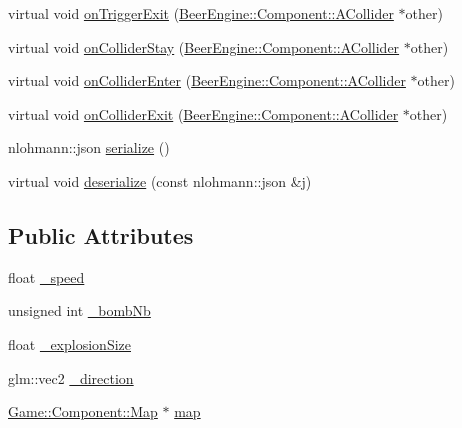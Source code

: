 \begin{DoxyCompactItemize}
\item 
virtual void \mbox{\hyperlink{class_game_1_1_component_1_1_character_a1acc86ac5340ef65ba18d755f1ea37f9}{on\+Trigger\+Exit}} (\mbox{\hyperlink{class_beer_engine_1_1_component_1_1_a_collider}{Beer\+Engine\+::\+Component\+::\+A\+Collider}} $\ast$other)
\item 
virtual void \mbox{\hyperlink{class_game_1_1_component_1_1_character_afdb1ebc07baa1a95840af9dfb48d9348}{on\+Collider\+Stay}} (\mbox{\hyperlink{class_beer_engine_1_1_component_1_1_a_collider}{Beer\+Engine\+::\+Component\+::\+A\+Collider}} $\ast$other)
\item 
virtual void \mbox{\hyperlink{class_game_1_1_component_1_1_character_abf25f82178afa36cf7fcf148877fad24}{on\+Collider\+Enter}} (\mbox{\hyperlink{class_beer_engine_1_1_component_1_1_a_collider}{Beer\+Engine\+::\+Component\+::\+A\+Collider}} $\ast$other)
\item 
virtual void \mbox{\hyperlink{class_game_1_1_component_1_1_character_afe4232175cd33c92027adacba5217b16}{on\+Collider\+Exit}} (\mbox{\hyperlink{class_beer_engine_1_1_component_1_1_a_collider}{Beer\+Engine\+::\+Component\+::\+A\+Collider}} $\ast$other)
\item 
nlohmann\+::json \mbox{\hyperlink{class_game_1_1_component_1_1_character_a4f77e3bf02c40339350f47626d57dad8}{serialize}} ()
\item 
virtual void \mbox{\hyperlink{class_game_1_1_component_1_1_character_adb7763de218329815eb32867c3e4c152}{deserialize}} (const nlohmann\+::json \&j)
\end{DoxyCompactItemize}
\subsection*{Public Attributes}
\begin{DoxyCompactItemize}
\item 
float \mbox{\hyperlink{class_game_1_1_component_1_1_character_af6a565172ae44aa7765f1feb1ab28ee8}{\+\_\+speed}}
\item 
unsigned int \mbox{\hyperlink{class_game_1_1_component_1_1_character_a73b8bee9cac08ea4dc429fd36b35ced0}{\+\_\+bomb\+Nb}}
\item 
float \mbox{\hyperlink{class_game_1_1_component_1_1_character_a393bffe7a12a9ad9f838a132ef1dda49}{\+\_\+explosion\+Size}}
\item 
glm\+::vec2 \mbox{\hyperlink{class_game_1_1_component_1_1_character_a383368d4f671c501c25796b832b336dd}{\+\_\+direction}}
\item 
\mbox{\hyperlink{class_game_1_1_component_1_1_map}{Game\+::\+Component\+::\+Map}} $\ast$ \mbox{\hyperlink{class_game_1_1_component_1_1_character_adfdba2160bd763fe595e557e344b41b3}{map}}
\end{DoxyCompactItemize}
